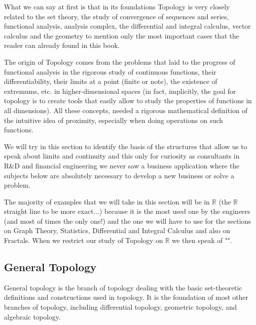 	What we can say at first is that in its foundations Topology is very closely related to the set theory, the study of convergence of sequences and series, functional analysis, analysis complex, the differential and integral calculus, vector calculus and the geometry to mention only the most important cases that the reader can already found in this book.

	The origin of Topology comes from the problems that laid to the progress of functional analysis in the rigorous study of continuous functions, their differentiability, their limits at a point (finite or note), the existence of extremums, etc. in higher-dimensional spaces (in fact, implicitly, the goal for topology is to create tools that easily allow to study the properties of functions in all dimensions). All these concepts, needed a rigorous mathematical definition of the intuitive idea of proximity, especially when doing operations on such functions.

	We will try in this section to identify the basis of the structures that allow us to speak about limits and continuity and this only for curiosity as consultants in R\&D and financial engineering we never saw a business application where the subjects below are absolutely necessary to develop a new business or solve a problem. 
	
	The majority of examples that we will take in this section will be in $\mathbb{R}$ (the $\mathbb{R}$ straight line to be more exact...) because it is the most used one by the engineers (and most of times the only one!) and the one we will have to use for the sections on Graph Theory, Statistics, Differential and Integral Calculus and also on Fractals. When we restrict our study of Topology on $\mathbb{R}$ we then speak of "".

	\subsection{General Topology}

General topology is the branch of topology dealing with the basic set-theoretic definitions and constructions used in topology. It is the foundation of most other branches of topology, including differential topology, geometric topology, and algebraic topology.

